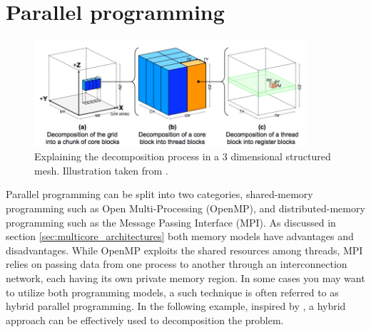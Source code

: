 \section{Parallel programming}
\label{sec:problem_decomposition}
\begin{figure}[h]
 \centering 
     \includegraphics[width=0.9\textwidth]{bilder/b_decomposition}
     \caption{Explaining the decomposition process in a 3 dimensional structured mesh. Illustration taken from \cite{article9}.
     \label{b_decomposition.png}}
\end{figure}
Parallel programming can be split into two categories, shared-memory programming such as Open Multi-Processing (OpenMP), and distributed-memory programming such as the Message Passing Interface (MPI). As discussed in section \ref{sec:multicore_architectures} both memory models have advantages and disadvantages. While OpenMP exploits the shared resources among threads, MPI relies on passing data from one process to another through an interconnection network, each having its own private memory region. In some cases you may want to utilize both programming models, a such technique is often referred to as hybrid parallel programming. In the following example, inspired by \cite{article9}, a hybrid approach can be effectively used to decomposition the problem.

